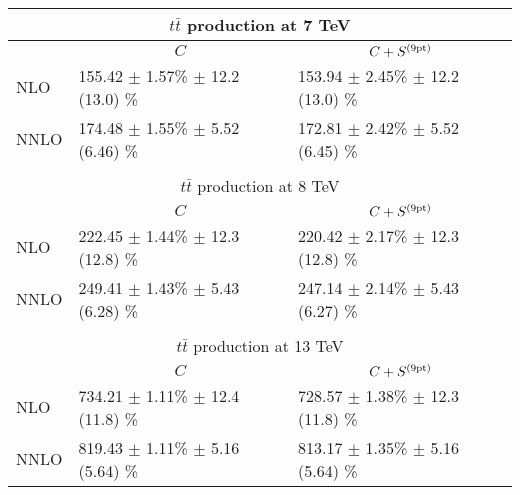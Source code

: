 \renewcommand*{\arraystretch}{1.5}
\begin{tabular}{lll}
\multicolumn{3}{c}{ $t\bar{t}$ production at 7 TeV}\\
\toprule
     & \multicolumn{1}{c}{$C$} & \multicolumn{1}{c}{$C+S^{(\rm 9pt)}$} \\
\midrule
NLO   &  155.42 $\pm$ 1.57\% $\pm$ 12.2 (13.0) \%   & 153.94 $\pm$ 2.45\% $\pm$ 12.2 (13.0) \% \\
NNLO  &  174.48 $\pm$ 1.55\% $\pm$ 5.52 (6.46) \%   & 172.81 $\pm$ 2.42\% $\pm$ 5.52 (6.45) \% \\
\bottomrule
\\[-0.3cm]
\multicolumn{3}{c}{ $t\bar{t}$ production at 8 TeV}\\
\toprule
     & \multicolumn{1}{c}{$C$} & \multicolumn{1}{c}{$C+S^{(\rm 9pt)}$} \\
\midrule
NLO   &  222.45 $\pm$ 1.44\% $\pm$ 12.3 (12.8) \%   & 220.42 $\pm$ 2.17\% $\pm$ 12.3 (12.8) \% \\
NNLO  &  249.41 $\pm$ 1.43\% $\pm$ 5.43 (6.28) \%   & 247.14 $\pm$ 2.14\% $\pm$ 5.43 (6.27) \% \\
\bottomrule
\\[-0.3cm]
\multicolumn{3}{c}{ $t\bar{t}$ production at 13 TeV}\\
\toprule
     & \multicolumn{1}{c}{$C$} & \multicolumn{1}{c}{$C+S^{(\rm 9pt)}$} \\
\midrule
NLO   &  734.21 $\pm$ 1.11\% $\pm$ 12.4 (11.8) \%   & 728.57 $\pm$ 1.38\% $\pm$ 12.3 (11.8) \% \\
NNLO  &  819.43 $\pm$ 1.11\% $\pm$ 5.16 (5.64) \%   & 813.17 $\pm$ 1.35\% $\pm$ 5.16 (5.64) \% \\
\bottomrule
\end{tabular}
